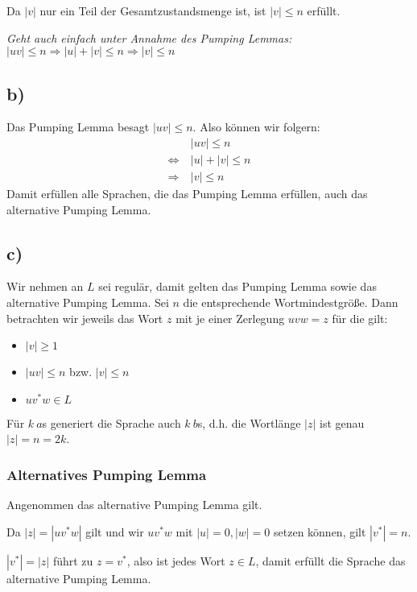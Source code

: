 \documentclass{article}
\begin{document}
Da $|v|$ nur ein Teil der Gesamtzustandsmenge ist, ist $|v| \leq n$ erfüllt.

\vspace{1em} \textit{Geht auch einfach unter Annahme des Pumping Lemmas: \\$|uv|\leq n \Rightarrow |u|+|v|\leq n \Rightarrow |v| \leq n$}


\subsection*{b)}
Das Pumping Lemma besagt $|uv| \leq n$. Also können wir folgern:
\setcounter{equation}{0}
\begin{align}
                 & |uv| \leq n \\
\Leftrightarrow\ & |u|+|v| \leq n \\
\Rightarrow    \ & |v| \leq n
\end{align}
Damit erfüllen alle Sprachen, die das Pumping Lemma erfüllen, auch das alternative Pumping Lemma.


\subsection*{c)}
Wir nehmen an $L$ sei regulär, damit gelten das Pumping Lemma sowie das alternative Pumping Lemma. Sei $n$ die entsprechende Wortmindestgröße. Dann betrachten wir jeweils das Wort $z$ mit je einer Zerlegung $uvw=z$ für die gilt:

\begin{itemize}
	\item $|v| \geq 1$
	\item $|uv| \leq n$ bzw. $|v| \leq n$
	\item $uv^*w \in L$
\end{itemize}

Für $k\ a$s generiert die Sprache auch $k\ b$s, d.h. die Wortlänge $|z|$ ist genau $|z| = n = 2k$.

\subsubsection*{Alternatives Pumping Lemma}
Angenommen das alternative Pumping Lemma gilt.

Da $|z| = |uv^*w|$ gilt und wir $uv^*w$ mit $|u| = 0, |w| = 0$ setzen können, gilt $|v^*| = n$.

$|v^*| =|z|$ führt zu $z = v^*$, also ist jedes Wort $z \in L$, damit erfüllt die Sprache das alternative Pumping Lemma.
\end{document}
